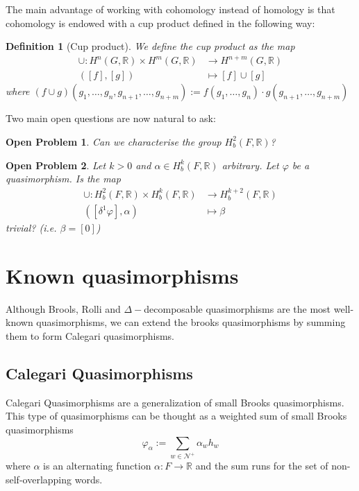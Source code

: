 \documentclass[leqno]{article}
\newtheorem*{definition}{Definition}
\newtheorem*{openproblem}{Open Problem}
\begin{document}
The main advantage of working with cohomology instead of homology is that cohomology is endowed with a cup product defined in the following way:

 \begin{definition}[Cup product] We define the cup product as the map
\begin{align*}
  \cup : H^n(G, \mathbb{R}) \times H^m(G, \mathbb{R}) &\to H^{n+m}(G, \mathbb{R}) \\
  ([f], [g]) & \mapsto [f]\cup [g] 
\end{align*} 
where $(f\cup g)(g_1, \ldots, g_n, g_{n+1}, \ldots, g_{n+m}) := f(g_1, \ldots, g_n)\cdot g(g_{n+1}, \ldots, g_{n+m})$
\end{definition}

Two main open questions are now natural to ask:

\begin{openproblem} Can we characterise the group $H^2_b(F, \mathbb{R})$?
\end{openproblem}

\begin{openproblem} Let  $k>0$ and  $\alpha \in H^k_b(F, \mathbb{R})$ arbitrary. Let $\varphi $ be a quasimorphism. Is  the map
  \begin{align*}
	\cup : H^2_b(F, \mathbb{R}) \times H_b^k(F, \mathbb{R}) &\to H^{k+2}_b(F, \mathbb{R}) \\
	([\delta^1\varphi], \alpha ) &\mapsto \beta 
  \end{align*}
  trivial? (i.e. $\beta =[0]$)
\end{openproblem}

\section{Known quasimorphisms} 
Although Brools, Rolli and $\Delta -$decomposable quasimorphisms are the most well-known quasimorphisms, we can extend the brooks quasimorphisms by summing them to form Calegari quasimorphisms.

\subsection{Calegari Quasimorphisms}
Calegari Quasimorphisms are a generalization of small Brooks quasimorphisms. This type of quasimorphisms can be thought as a weighted sum of small Brooks quasimorphisms
\[
\varphi _\alpha := \sum_{w\in \mathcal{N}^+} \alpha _w h_w
\] 
where $\alpha $ is an alternating function $\alpha :F\to \mathbb{R}$ and the sum runs for the set of non-self-overlapping words.
\end{document}
